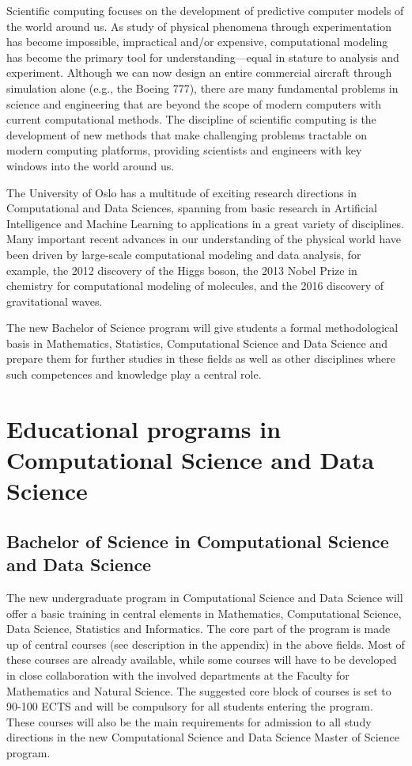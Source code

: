 \documentclass[oneside,final,10pt]{article}
\begin{document}
Scientific computing focuses on the development of predictive computer models of the world around us. As study of physical phenomena through experimentation has become impossible, impractical and/or expensive, computational modeling has become the primary tool for understanding—equal in stature to analysis and experiment. Although we can now design an entire commercial aircraft through simulation alone (e.g., the Boeing 777), there are many fundamental problems in science and engineering that are beyond the scope of modern computers with current computational methods. The discipline of scientific computing is the development of new methods that make challenging problems tractable on modern computing platforms, providing scientists and engineers with key windows into the world around us.

The University of Oslo has a multitude of exciting research directions in Computational and Data Sciences, spanning from basic research in Artificial Intelligence and Machine Learning to applications in a great variety of disciplines. Many important recent advances in our understanding of the physical world have been driven by large-scale computational modeling and data analysis, for example, the 2012 discovery of the Higgs boson, the 2013 Nobel Prize in chemistry for computational modeling of molecules, and the 2016 discovery of gravitational waves.

The new Bachelor of Science program will give students a formal methodological basis in Mathematics, Statistics, Computational Science and Data Science and prepare them for further studies in these fields as well as other disciplines where such competences and knowledge play a central role. 



\section*{Educational programs in Computational Science and Data Science}


\subsection*{Bachelor of Science in Computational Science and Data Science}

The new undergraduate program in Computational Science and Data Science will offer a basic training in central elements in Mathematics, Computational Science, Data Science, Statistics and Informatics. 
The core part of the program is made up of central courses (see description in the appendix) in the above fields. Most of these courses are already available, while some courses will have to be developed in close collaboration with the involved departments at the Faculty for Mathematics and Natural Science.
The suggested core block of courses is set to 90-100 ECTS and will be compulsory for all students entering the program. These courses will also be the main requirements for admission to
 all study directions in the new Computational Science and Data Science Master of Science program.
\end{document}
